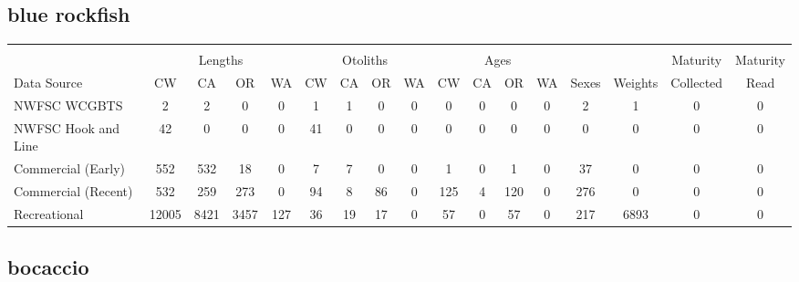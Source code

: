 \documentclass[12pt,]{article}
\begin{document}
\FloatBarrier  

\subsection{blue rockfish}\label{blue-rockfish}

\begin{table}[ht]
\centering
\begingroup\fontsize{10pt}{10pt}\selectfont
\begin{tabular}{|l|cccc|cccc|cccc|c|c|c|c|}
  \hline
 &  &  &  &  &  &  &  &  &  &  &  &  &  &  &  &  \\ 
   & \multicolumn{4}{c}{Lengths} &  \multicolumn{4}{c}{Otoliths} & \multicolumn{4}{c}{Ages} &  & & Maturity & Maturity\\
 Data Source & CW & CA & OR & WA & CW & CA & OR & WA & CW & CA & OR & WA & Sexes & Weights & Collected & Read\\
 \hline
NWFSC WCGBTS & 2 & 2 & 0 & 0 & 1 & 1 & 0 & 0 & 0 & 0 & 0 & 0 & 2 & 1 & 0 & 0 \\ 
  NWFSC Hook and Line & 42 & 0 & 0 & 0 & 41 & 0 & 0 & 0 & 0 & 0 & 0 & 0 & 0 & 0 & 0 & 0 \\ 
  Commercial (Early) & 552 & 532 & 18 & 0 & 7 & 7 & 0 & 0 & 1 & 0 & 1 & 0 & 37 & 0 & 0 & 0 \\ 
  Commercial (Recent) & 532 & 259 & 273 & 0 & 94 & 8 & 86 & 0 & 125 & 4 & 120 & 0 & 276 & 0 & 0 & 0 \\ 
  Recreational & 12005 & 8421 & 3457 & 127 & 36 & 19 & 17 & 0 & 57 & 0 & 57 & 0 & 217 & 6893 & 0 & 0 \\ 
   \hline
\end{tabular}
\endgroup
\end{table}

\FloatBarrier  

\subsection{bocaccio}\label{bocaccio}
\end{document}
